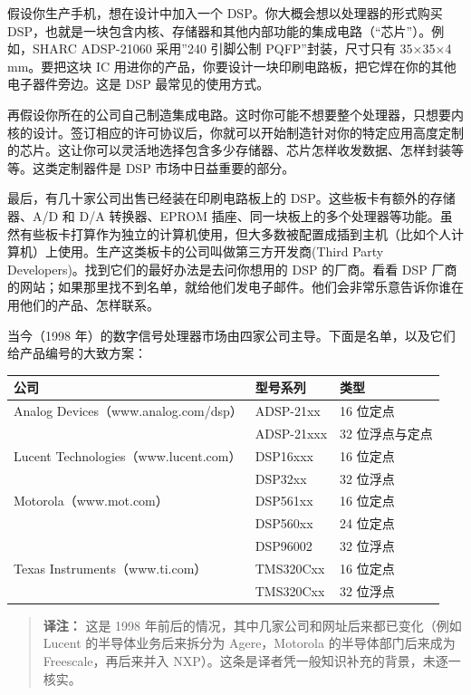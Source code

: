 假设你生产手机，想在设计中加入一个 DSP。你大概会想以处理器的形式购买
DSP，也就是一块包含内核、存储器和其他内部功能的集成电路（``芯片''）。例如，SHARC
ADSP-21060 采用''240 引脚公制 PQFP''封装，尺寸只有 35×35×4 mm。要把这块
IC
用进你的产品，你要设计一块印刷电路板，把它焊在你的其他电子器件旁边。这是
DSP 最常见的使用方式。

再假设你所在的公司自己制造集成电路。这时你可能不想要整个处理器，只想要内核的设计。签订相应的许可协议后，你就可以开始制造针对你的特定应用高度定制的芯片。这让你可以灵活地选择包含多少存储器、芯片怎样收发数据、怎样封装等等。这类定制器件是
DSP 市场中日益重要的部分。

最后，有几十家公司出售已经装在印刷电路板上的
DSP。这些板卡有额外的存储器、A/D 和 D/A 转换器、EPROM
插座、同一块板上的多个处理器等功能。虽然有些板卡打算作为独立的计算机使用，但大多数被配置成插到主机（比如个人计算机）上使用。生产这类板卡的公司叫做第三方开发商(Third
Party Developers)。找到它们的最好办法是去问你想用的 DSP 的厂商。看看 DSP
厂商的网站；如果那里找不到名单，就给他们发电子邮件。他们会非常乐意告诉你谁在用他们的产品、怎样联系。

当今（1998
年）的数字信号处理器市场由四家公司主导。下面是名单，以及它们给产品编号的大致方案：

{\def\LTcaptype{none} %
\begin{longtable}[]{@{}lll@{}}
\toprule\noalign{}
公司 & 型号系列 & 类型 \\
\midrule\noalign{}
\endhead
\bottomrule\noalign{}
\endlastfoot
Analog Devices（www.analog.com/dsp） & ADSP-21xx & 16 位定点 \\
& ADSP-21xxx & 32 位浮点与定点 \\
Lucent Technologies（www.lucent.com） & DSP16xxx & 16 位定点 \\
& DSP32xx & 32 位浮点 \\
Motorola（www.mot.com） & DSP561xx & 16 位定点 \\
& DSP560xx & 24 位定点 \\
& DSP96002 & 32 位浮点 \\
Texas Instruments（www.ti.com） & TMS320Cxx & 16 位定点 \\
& TMS320Cxx & 32 位浮点 \\
\end{longtable}
}

\begin{quote}
\textbf{译注：} 这是 1998
年前后的情况，其中几家公司和网址后来都已变化（例如 Lucent
的半导体业务后来拆分为 Agere，Motorola 的半导体部门后来成为
Freescale，再后来并入
NXP）。这条是译者凭一般知识补充的背景，未逐一核实。
\end{quote}

